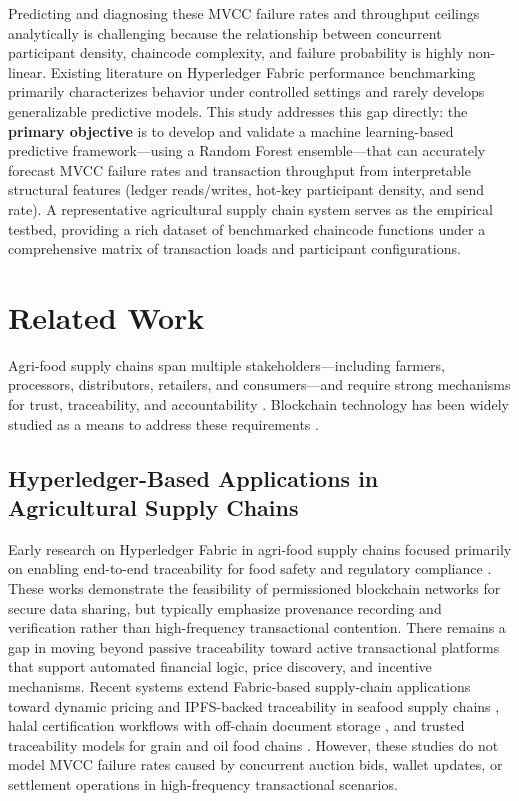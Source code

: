 ﻿\documentclass[12pt]{article}
\begin{document}
Predicting and diagnosing these MVCC failure rates and throughput ceilings analytically is challenging because the relationship between concurrent participant density, chaincode complexity, and failure probability is highly non-linear. Existing literature on Hyperledger Fabric performance benchmarking primarily characterizes behavior under controlled settings and rarely develops generalizable predictive models. This study addresses this gap directly: the \textbf{primary objective} is to develop and validate a machine learning-based predictive framework---using a Random Forest ensemble---that can accurately forecast MVCC failure rates and transaction throughput from interpretable structural features (ledger reads/writes, hot-key participant density, and send rate). A representative agricultural supply chain system serves as the empirical testbed, providing a rich dataset of benchmarked chaincode functions under a comprehensive matrix of transaction loads and participant configurations.
	
\section{Related Work}

Agri-food supply chains span multiple stakeholders---including farmers, processors, distributors, retailers, and consumers---and require strong mechanisms for trust, traceability, and accountability \citep{weerabahu_challenges_2022,nayal_antecedents_2021}. Blockchain technology has been widely studied as a means to address these requirements \citep{zhao_blockchain_2019,shahid_blockchain-based_2020}.

	\subsection{Hyperledger-Based Applications in Agricultural Supply Chains}
	
	Early research on Hyperledger Fabric in agri-food supply chains focused primarily on enabling end-to-end traceability for food safety and regulatory compliance \cite{marchese_blockchain-based_2022, zhang_information_2022, iftekhar_blockchain-based_2021, joo_evidence_2021}. These works demonstrate the feasibility of permissioned blockchain networks for secure data sharing, but typically emphasize provenance recording and verification rather than high-frequency transactional contention. There remains a gap in moving beyond passive traceability toward active transactional platforms that support automated financial logic, price discovery, and incentive mechanisms. Recent systems extend Fabric-based supply-chain applications toward dynamic pricing and IPFS-backed traceability in seafood supply chains \cite{rani_stp_2025}, halal certification workflows with off-chain document storage \cite{talib_blockchain-enabled_2026}, and trusted traceability models for grain and oil food chains \cite{zhang_blockchain-based_2023}. However, these studies do not model MVCC failure rates caused by concurrent auction bids, wallet updates, or settlement operations in high-frequency transactional scenarios.
	
\end{document}
